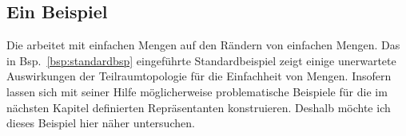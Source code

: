 % 
% 
% 
%     

    \subsection{Ein Beispiel}\label{ssec:standardbsp}
    Die \strukt arbeitet mit einfachen Mengen auf den Rändern von einfachen Mengen.
    Das in Bsp.~\ref{bsp:standardbsp} eingeführte Standardbeispiel zeigt einige unerwartete Auswirkungen der Teilraumtopologie für die Einfachheit von Mengen.
    Insofern lassen sich mit seiner Hilfe möglicherweise problematische Beispiele für die im nächsten Kapitel definierten Repräsentanten konstruieren.
    Deshalb möchte ich dieses Beispiel hier näher untersuchen.
    
